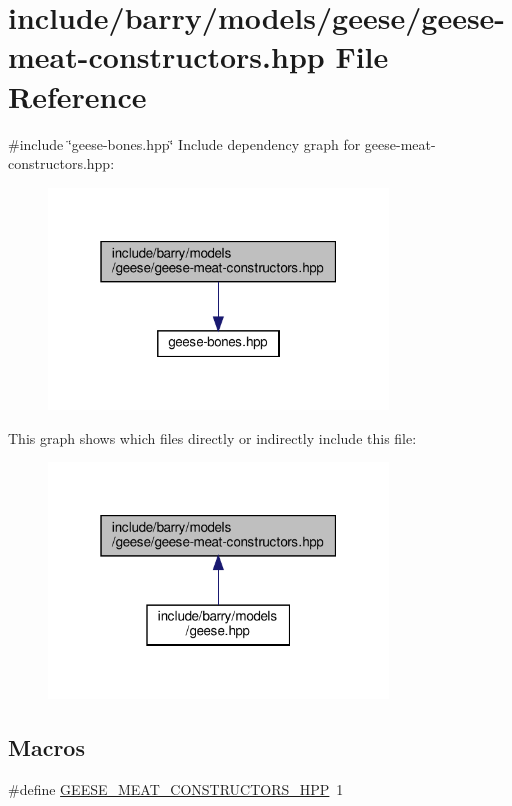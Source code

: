 \hypertarget{geese-meat-constructors_8hpp}{}\section{include/barry/models/geese/geese-\/meat-\/constructors.hpp File Reference}
\label{geese-meat-constructors_8hpp}
{\ttfamily \#include \char`\"{}geese-\/bones.\+hpp\char`\"{}}\newline
Include dependency graph for geese-\/meat-\/constructors.hpp\+:
\nopagebreak
\begin{figure}[H]
\begin{center}
\leavevmode
\includegraphics[width=256pt]{geese-meat-constructors_8hpp__incl}
\end{center}
\end{figure}
This graph shows which files directly or indirectly include this file\+:
\nopagebreak
\begin{figure}[H]
\begin{center}
\leavevmode
\includegraphics[width=256pt]{geese-meat-constructors_8hpp__dep__incl}
\end{center}
\end{figure}
\subsection*{Macros}
\begin{DoxyCompactItemize}
\item 
\#define \hyperlink{geese-meat-constructors_8hpp_a95bcd4c1ebfec95819701b9831eca55e}{G\+E\+E\+S\+E\+\_\+\+M\+E\+A\+T\+\_\+\+C\+O\+N\+S\+T\+R\+U\+C\+T\+O\+R\+S\+\_\+\+H\+PP}~1
\end{DoxyCompactItemize}



